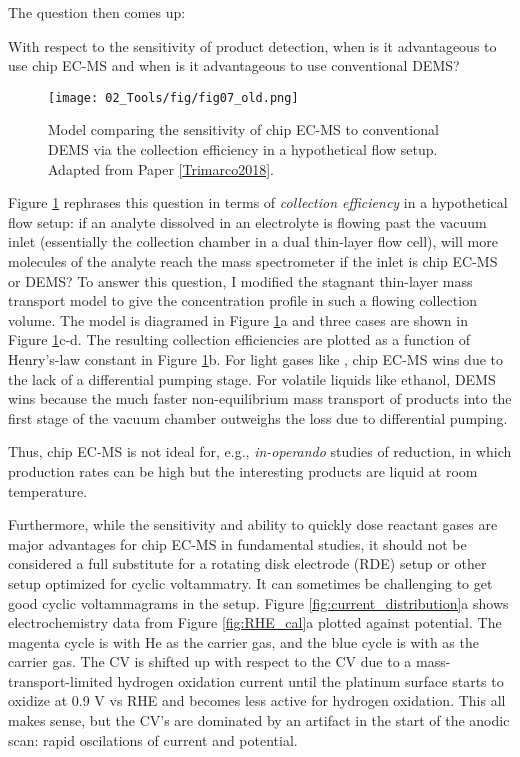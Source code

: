 The question then comes up:
\begin{question}
	With respect to the sensitivity of product detection, when is it advantageous to use chip EC-MS and when is it advantageous to use conventional DEMS?
\end{question}
\begin{figure}[t]
	\texttt{[image: 02\_Tools/fig/fig07\_old.png]}
	\caption{Model comparing the sensitivity of chip EC-MS to conventional DEMS via the collection efficiency in a hypothetical flow setup. Adapted from Paper \ref{Trimarco2018}.}
	\label{fig:sensitivity}
\end{figure}
Figure \ref{fig:sensitivity} rephrases this question in terms of \textit{collection efficiency} in a hypothetical flow setup: if an analyte dissolved in an electrolyte is flowing past the vacuum inlet (essentially the collection chamber in a dual thin-layer flow cell\cite{Jusys1999, Clark2015}), will more molecules of the analyte reach the mass spectrometer if the inlet is chip EC-MS or DEMS? To answer this question, I modified the stagnant thin-layer mass transport model to give the concentration profile in such a flowing collection volume\cite{Scott2016_MSc}. The model is diagramed in Figure \ref{fig:sensitivity}a and three cases are shown in Figure \ref{fig:sensitivity}c-d. The resulting collection efficiencies are plotted as a function of Henry's-law constant in Figure \ref{fig:sensitivity}b. For light gases like , chip EC-MS wins due to the lack of a differential pumping stage. For volatile liquids like ethanol, DEMS wins because the much faster non-equilibrium mass transport of products into the first stage of the vacuum chamber outweighs the loss due to differential pumping. 

Thus, chip EC-MS is not ideal for, e.g., \textit{in-operando} studies of  reduction, in which production rates can be high but the interesting products are liquid at room temperature.

\vspace{5mm}
Furthermore, while the sensitivity and ability to quickly dose reactant gases are major advantages for chip EC-MS in fundamental studies, it should not be considered a full substitute for a rotating disk electrode (RDE) setup or other setup optimized for cyclic voltammatry. It can sometimes be challenging to get good cyclic voltammagrams in the setup. Figure \ref{fig:current_distribution}a shows electrochemistry data from Figure \ref{fig:RHE_cal}a plotted against potential. The magenta cycle is with He as the carrier gas, and the blue cycle is with  as the carrier gas. The  CV is shifted up with respect to the  CV due to a mass-transport-limited hydrogen oxidation current until the platinum surface starts to oxidize at 0.9 V vs RHE and becomes less active for hydrogen oxidation. This all makes sense, but the CV's are dominated by an artifact in the start of the anodic scan: rapid oscilations of current and potential. 

